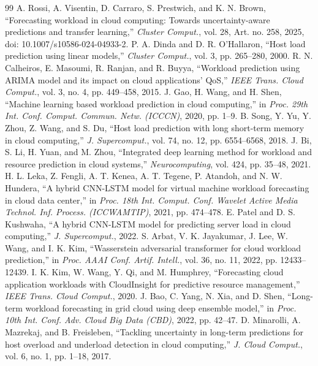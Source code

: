\documentclass[conference]{IEEEtran}
\begin{document}
\begin{thebibliography}{99}
 A. Rossi, A. Visentin, D. Carraro, S. Prestwich, and K. N. Brown, ``Forecasting workload in cloud computing: Towards uncertainty-aware predictions and transfer learning,'' \textit{Cluster Comput.}, vol. 28, Art. no. 258, 2025, doi: 10.1007/s10586-024-04933-2.
 P. A. Dinda and D. R. O'Hallaron, ``Host load prediction using linear models,'' \textit{Cluster Comput.}, vol. 3, pp. 265--280, 2000.
 R. N. Calheiros, E. Masoumi, R. Ranjan, and R. Buyya, ``Workload prediction using ARIMA model and its impact on cloud applications' QoS,'' \textit{IEEE Trans. Cloud Comput.}, vol. 3, no. 4, pp. 449--458, 2015.
 J. Gao, H. Wang, and H. Shen, ``Machine learning based workload prediction in cloud computing,'' in \textit{Proc. 29th Int. Conf. Comput. Commun. Netw. (ICCCN)}, 2020, pp. 1--9.
 B. Song, Y. Yu, Y. Zhou, Z. Wang, and S. Du, ``Host load prediction with long short-term memory in cloud computing,'' \textit{J. Supercomput.}, vol. 74, no. 12, pp. 6554--6568, 2018.
 J. Bi, S. Li, H. Yuan, and M. Zhou, ``Integrated deep learning method for workload and resource prediction in cloud systems,'' \textit{Neurocomputing}, vol. 424, pp. 35--48, 2021.
 H. L. Leka, Z. Fengli, A. T. Kenea, A. T. Tegene, P. Atandoh, and N. W. Hundera, ``A hybrid CNN-LSTM model for virtual machine workload forecasting in cloud data center,'' in \textit{Proc. 18th Int. Comput. Conf. Wavelet Active Media Technol. Inf. Process. (ICCWAMTIP)}, 2021, pp. 474--478.
 E. Patel and D. S. Kushwaha, ``A hybrid CNN-LSTM model for predicting server load in cloud computing,'' \textit{J. Supercomput.}, 2022.
 S. Arbat, V. K. Jayakumar, J. Lee, W. Wang, and I. K. Kim, ``Wasserstein adversarial transformer for cloud workload prediction,'' in \textit{Proc. AAAI Conf. Artif. Intell.}, vol. 36, no. 11, 2022, pp. 12433--12439.
 I. K. Kim, W. Wang, Y. Qi, and M. Humphrey, ``Forecasting cloud application workloads with CloudInsight for predictive resource management,'' \textit{IEEE Trans. Cloud Comput.}, 2020.
 J. Bao, C. Yang, N. Xia, and D. Shen, ``Long-term workload forecasting in grid cloud using deep ensemble model,'' in \textit{Proc. 10th Int. Conf. Adv. Cloud Big Data (CBD)}, 2022, pp. 42--47.
 D. Minarolli, A. Mazrekaj, and B. Freisleben, ``Tackling uncertainty in long-term predictions for host overload and underload detection in cloud computing,'' \textit{J. Cloud Comput.}, vol. 6, no. 1, pp. 1--18, 2017.

\end{thebibliography}
\end{document}

